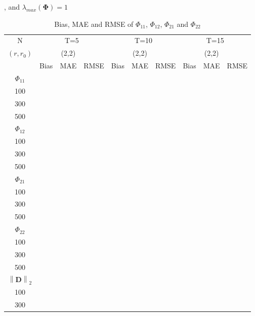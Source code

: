 \documentclass[12pt,a4paper,hyperref]{article}
\begin{document}
\begin{table}[H]
\caption{Bias, MAE and RMSE of $\Phi_{11}$, $\Phi_{12}$, $\Phi_{21}$ and $\Phi_{22}$}, and $\lambda_{max}(\boldsymbol{\Phi})=1$    \label{table1}
\centering
\tabcolsep=0.11cm
\begin{threeparttable}
\begin{tabular} {*{10}{c}}
\toprule
N& \multicolumn{3}{c}{T=5}&\multicolumn{3}{c}{T=10}&\multicolumn{3}{c}{T=15}\\
\cmidrule(lr){1-10}
$(r,r_{0})$ &   &(2,2)  &  &   &(2,2)  & &  &(2,2) & \\
\cmidrule(lr){1-4} \cmidrule(lr){5-7}\cmidrule(lr){8-10}
& \multicolumn{1}{c}{Bias} &\multicolumn{1}{c}{MAE}& \multicolumn{1}{c}{RMSE}&\multicolumn{1}{c}{Bias} &\multicolumn{1}{c}{MAE}& \multicolumn{1}{c}{RMSE}&\multicolumn{1}{c}{Bias}&\multicolumn{1}{c}{MAE} & \multicolumn{1}{c}{RMSE}\\
  \cmidrule(lr){2-4} \cmidrule(lr){5-7} \cmidrule(lr){8-10}
 $\Phi_{11}$\\
\cmidrule(lr){1-10}
 100&  & & &	  &	& & & &   \\
300&   &  & &	  &	&	& & &  \\
500& &  &   &	  &	& & & &	  \\
\cmidrule(lr){1-10}
$\Phi_{12}$\\
\cmidrule(lr){1-4}   \cmidrule(lr){5-7}   \cmidrule(lr){8-10}
  100&  & & &	  &	& & & &   \\
300&   &  & &	  &	&	& & &  \\
500& &  &   &	  &	& & & &	  \\
\cmidrule(lr){1-10}
$\Phi_{21}$\\
\cmidrule(lr){1-4}   \cmidrule(lr){5-7}   \cmidrule(lr){8-10}
 100&  & & &	  &	& & & &   \\
300&   &  & &	  &	&	& & &  \\
500& &  &   &	  &	& & & &	  \\
\cmidrule(lr){1-10}
$\Phi_{22}$\\
\cmidrule(lr){1-4}   \cmidrule(lr){5-7}   \cmidrule(lr){8-10}
 100&  & & &	  &	& & & &   \\
300&   &  & &	  &	&	& & &  \\
500& &  &   &	  &	& & & &	  \\
\cmidrule(lr){1-10}
$\left\| \boldsymbol{D} \right\|_{2} $\\
\cmidrule(lr){1-4}   \cmidrule(lr){5-7}   \cmidrule(lr){8-10}
100&  & & &	  &	& & & &   \\
300&   &  & &	  &	&	& & &  \\

\end{tabular}
\end{threeparttable}
\end{table}
\end{document}
